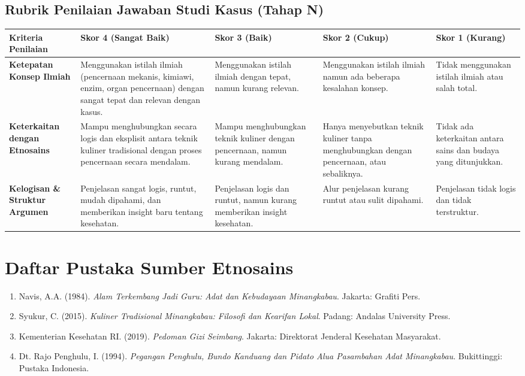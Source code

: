 \documentclass[a4paper,12pt]{article}
\begin{document}
\subsection{Rubrik Penilaian Jawaban Studi Kasus (Tahap N)}

\begin{longtable}{|p{3cm}|p{3cm}|p{3cm}|p{3cm}|p{3cm}|}
\hline
\textbf{Kriteria Penilaian} & \textbf{Skor 4 (Sangat Baik)} & \textbf{Skor 3 (Baik)} & \textbf{Skor 2 (Cukup)} & \textbf{Skor 1 (Kurang)} \\
\hline
\textbf{Ketepatan Konsep Ilmiah} & Menggunakan istilah ilmiah (pencernaan mekanis, kimiawi, enzim, organ pencernaan) dengan sangat tepat dan relevan dengan kasus. & Menggunakan istilah ilmiah dengan tepat, namun kurang relevan. & Menggunakan istilah ilmiah namun ada beberapa kesalahan konsep. & Tidak menggunakan istilah ilmiah atau salah total. \\
\hline
\textbf{Keterkaitan dengan Etnosains} & Mampu menghubungkan secara logis dan eksplisit antara teknik kuliner tradisional dengan proses pencernaan secara mendalam. & Mampu menghubungkan teknik kuliner dengan pencernaan, namun kurang mendalam. & Hanya menyebutkan teknik kuliner tanpa menghubungkan dengan pencernaan, atau sebaliknya. & Tidak ada keterkaitan antara sains dan budaya yang ditunjukkan. \\
\hline
\textbf{Kelogisan \& Struktur Argumen} & Penjelasan sangat logis, runtut, mudah dipahami, dan memberikan insight baru tentang kesehatan. & Penjelasan logis dan runtut, namun kurang memberikan insight kesehatan. & Alur penjelasan kurang runtut atau sulit dipahami. & Penjelasan tidak logis dan tidak terstruktur. \\
\hline
\end{longtable}

\section{Daftar Pustaka Sumber Etnosains}

\begin{enumerate}
\item Navis, A.A. (1984). \textit{Alam Terkembang Jadi Guru: Adat dan Kebudayaan Minangkabau}. Jakarta: Grafiti Pers.
\item Syukur, C. (2015). \textit{Kuliner Tradisional Minangkabau: Filosofi dan Kearifan Lokal}. Padang: Andalas University Press.
\item Kementerian Kesehatan RI. (2019). \textit{Pedoman Gizi Seimbang}. Jakarta: Direktorat Jenderal Kesehatan Masyarakat.
\item Dt. Rajo Penghulu, I. (1994). \textit{Pegangan Penghulu, Bundo Kanduang dan Pidato Alua Pasambahan Adat Minangkabau}. Bukittinggi: Pustaka Indonesia.
\end{enumerate}
\end{document}
